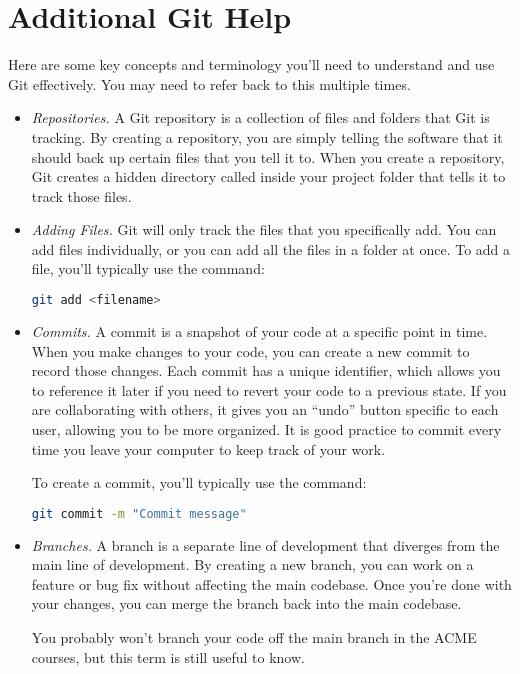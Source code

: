 \section*{Additional Git Help}
Here are some key concepts and terminology you'll need to understand and use Git effectively.
You may need to refer back to this multiple times.
\begin{itemize}
\item \emph{Repositories.}
A Git repository is a collection of files and folders that Git is tracking. 
By creating a repository, you are simply telling the software that it should back up certain files that you tell it to.
When you create a repository, Git creates a hidden directory called  inside your project folder that tells it to track those files.

\item \emph{Adding Files.}
Git will only track the files that you specifically add.
You can add files individually, or you can add all the files in a folder at once.
To add a file, you'll typically use the command:
\begin{lstlisting}[language=bash]
git add <filename>
\end{lstlisting}

\item \emph{Commits.}
A commit is a snapshot of your code at a specific point in time. 
When you make changes to your code, you can create a new commit to record those changes. 
Each commit has a unique identifier, which allows you to reference it later if you need to revert your code to a previous state.
If you are collaborating with others, it gives you an ``undo'' button specific to each user, allowing you to be more organized.
It is good practice to commit every time you leave your computer to keep track of your work.

To create a commit, you'll typically use the command:
\begin{lstlisting}[language=bash]
git commit -m "Commit message"
\end{lstlisting}

\item \emph{Branches.}
A branch is a separate line of development that diverges from the main line of development. 
By creating a new branch, you can work on a feature or bug fix without affecting the main codebase. 
Once you're done with your changes, you can merge the branch back into the main codebase.

You probably won't branch your code off the main branch in the ACME courses, but this term is still useful to know.


\end{itemize}
